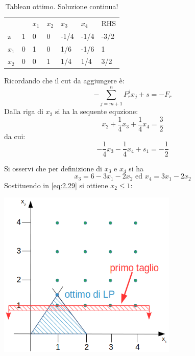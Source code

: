 \begin{table}[!h]
	\centering
	\begin{tabular}{lllllll}
				&                         & $x_{1}$ & $x_{2}$  & $x_{3}$ & $x_{4}$ &  RHS  \\ \cline{2-7}
			z	& \multicolumn{1}{|l|}{1} & 0       & 0        & -1/4    & -1/4    & \multicolumn{1}{|l|}{-3/2} \\ \cline{2-7}
		$x_{1}$ & \multicolumn{1}{|l|}{0} & 1       & 0        & 1/6     & -1/6    & \multicolumn{1}{|l|}{1} \\
		$x_{2}$ & \multicolumn{1}{|l|}{0} & 0       & 1        & 1/4     & 1/4     & \multicolumn{1}{|l|}{3/2} \\ \cline{2-7}
	\end{tabular}
	\caption{Tableau ottimo. Soluzione continua!}
\end{table}

Ricordando che il cut da aggiungere è:
\begin{equation}
-\sum_{j=m+1}^{n} F_{r}^{j} x_{j} + s = -F_{r}
\end{equation}
Dalla riga di $x_{2}$ si ha la sequente equzione:
\begin{equation}
	x_{2} + \frac{1}{4} x_{3} + \frac{1}{4} x_{4} = \frac{3}{2}
\end{equation}
da cui:
\begin{equation}\label{eq:2.29}
-\frac{1}{4}x_{3} - \frac{1}{4} x_{4} + s_{1} = -\frac{1}{2} 
\end{equation}

Si osservi che per definizione di $x_{3}$ e $x_{4}$ si ha
\begin{equation}
x_{3} = 6 - 3x_{1} - 2x_{2}\text{ ed }x_{4} = 3x_{1} - 2x_{2}
\end{equation}
\newpage
Sostituendo in \ref{eq:2.29} si ottiene $x_{2}\le 1$:

\centerline{\includegraphics[height=8cm]{images/graph13.png}}

